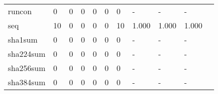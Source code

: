 \begin{longtable}{lp{1.20cm}p{1.20cm}p{1.20cm}p{1.20cm}p{1.20cm}p{1.20cm}p{1.20cm}p{1.20cm}p{1.20cm}p{1.20cm}}
runcon    &                                     0 &                                                  0 &                                                  0 &                                                  0 &                                                  0 &                                                  0 &                                             - &                                                  - &                                                  - \\
seq       &                                    10 &                                                  0 &                                                  0 &                                                  0 &                                                  0 &                                                 10 &                                         1.000 &                                              1.000 &                                              1.000 \\
sha1sum   &                                     0 &                                                  0 &                                                  0 &                                                  0 &                                                  0 &                                                  0 &                                             - &                                                  - &                                                  - \\
sha224sum &                                     0 &                                                  0 &                                                  0 &                                                  0 &                                                  0 &                                                  0 &                                             - &                                                  - &                                                  - \\
sha256sum &                                     0 &                                                  0 &                                                  0 &                                                  0 &                                                  0 &                                                  0 &                                             - &                                                  - &                                                  - \\
sha384sum &                                     0 &                                                  0 &                                                  0 &                                                  0 &                                                  0 &                                                  0 &                                             - &                                                  - &                                                  - \\

\end{longtable}
